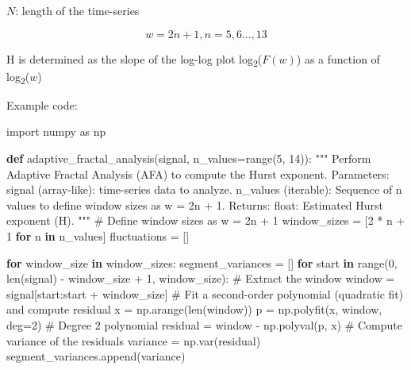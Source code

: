 \documentclass[
  sn-vancouver,
  Numbered,
  referee,
  lineno]{sn-jnl}
\newenvironment{Shaded}{\begin{snugshade}}{\end{snugshade}}
\newcommand{\BuiltInTok}[1]{\textcolor[rgb]{0.00,0.23,0.31}{#1}}
\newcommand{\CommentTok}[1]{\textcolor[rgb]{0.37,0.37,0.37}{#1}}
\newcommand{\ControlFlowTok}[1]{\textcolor[rgb]{0.00,0.23,0.31}{\textbf{#1}}}
\newcommand{\DecValTok}[1]{\textcolor[rgb]{0.68,0.00,0.00}{#1}}
\newcommand{\ImportTok}[1]{\textcolor[rgb]{0.00,0.46,0.62}{#1}}
\newcommand{\KeywordTok}[1]{\textcolor[rgb]{0.00,0.23,0.31}{\textbf{#1}}}
\newcommand{\NormalTok}[1]{\textcolor[rgb]{0.00,0.23,0.31}{#1}}
\newcommand{\OperatorTok}[1]{\textcolor[rgb]{0.37,0.37,0.37}{#1}}
\begin{document}
\(N\): length of the time-series

\[
w = 2n + 1, n = 5,6..., 13
\]

H is determined as the slope of the log-log plot
log\textsubscript{2}(\(F(w)\)) as a function of
log\textsubscript{2}(\(w\))

Example code:

\begin{Shaded}
\begin{Highlighting}[]
\ImportTok{import}\NormalTok{ numpy }\ImportTok{as}\NormalTok{ np}

\KeywordTok{def}\NormalTok{ adaptive\_fractal\_analysis(signal, n\_values}\OperatorTok{=}\BuiltInTok{range}\NormalTok{(}\DecValTok{5}\NormalTok{, }\DecValTok{14}\NormalTok{)):}
    \CommentTok{"""}
\CommentTok{    Perform Adaptive Fractal Analysis (AFA) to compute the Hurst exponent.}
\CommentTok{    }
\CommentTok{    Parameters:}
\CommentTok{        signal (array{-}like): time{-}series data to analyze.}
\CommentTok{        n\_values (iterable): Sequence of \textasciigrave{}n\textasciigrave{} values to define window sizes as w = 2n + 1.}
\CommentTok{    }
\CommentTok{    Returns:}
\CommentTok{        float: Estimated Hurst exponent (H).}
\CommentTok{    """}
    \CommentTok{\# Define window sizes as w = 2n + 1}
\NormalTok{    window\_sizes }\OperatorTok{=}\NormalTok{ [}\DecValTok{2} \OperatorTok{*}\NormalTok{ n }\OperatorTok{+} \DecValTok{1} \ControlFlowTok{for}\NormalTok{ n }\KeywordTok{in}\NormalTok{ n\_values]}
\NormalTok{    fluctuations }\OperatorTok{=}\NormalTok{ []}

    \ControlFlowTok{for}\NormalTok{ window\_size }\KeywordTok{in}\NormalTok{ window\_sizes:}
\NormalTok{        segment\_variances }\OperatorTok{=}\NormalTok{ []}
        \ControlFlowTok{for}\NormalTok{ start }\KeywordTok{in} \BuiltInTok{range}\NormalTok{(}\DecValTok{0}\NormalTok{, }\BuiltInTok{len}\NormalTok{(signal) }\OperatorTok{{-}}\NormalTok{ window\_size }\OperatorTok{+} \DecValTok{1}\NormalTok{, window\_size):}
            \CommentTok{\# Extract the window}
\NormalTok{            window }\OperatorTok{=}\NormalTok{ signal[start:start }\OperatorTok{+}\NormalTok{ window\_size]}
            \CommentTok{\# Fit a second{-}order polynomial (quadratic fit) and compute residual}
\NormalTok{            x }\OperatorTok{=}\NormalTok{ np.arange(}\BuiltInTok{len}\NormalTok{(window))}
\NormalTok{            p }\OperatorTok{=}\NormalTok{ np.polyfit(x, window, deg}\OperatorTok{=}\DecValTok{2}\NormalTok{)  }\CommentTok{\# Degree 2 polynomial}
\NormalTok{            residual }\OperatorTok{=}\NormalTok{ window }\OperatorTok{{-}}\NormalTok{ np.polyval(p, x)}
            \CommentTok{\# Compute variance of the residuals}
\NormalTok{            variance }\OperatorTok{=}\NormalTok{ np.var(residual)}
\NormalTok{            segment\_variances.append(variance)}
        

\end{Highlighting}
\end{Shaded}
\end{document}
